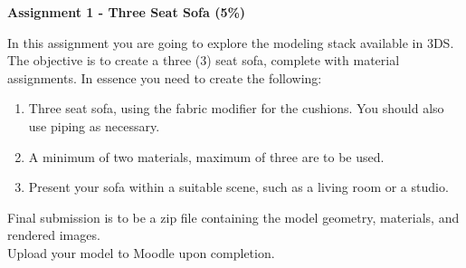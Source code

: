 
	
\begin{flushleft}
\Large\textbf{Assignment 1 - Three Seat Sofa (5\%)}\\
\end{flushleft}



In this assignment you are going to explore the modeling stack available in 3DS.  The objective is to create a three (3) seat sofa, complete with material assignments.  In essence you need to create the following:
\begin{enumerate}
	\item Three seat sofa, using the fabric modifier for the cushions.  You should also use piping as necessary.
	\item A minimum of two materials, maximum of three are to be used.
	\item Present your sofa within a suitable scene, such as a living room or a studio.
\end{enumerate}

Final submission is to be a zip file containing the model geometry, materials, and rendered images.\\

Upload your model to Moodle upon completion.

